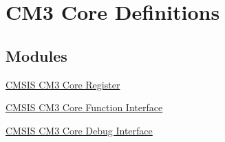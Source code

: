 \hypertarget{group___c_m_s_i_s___c_m3__core__definitions}{\section{C\-M3 Core Definitions}
\label{group___c_m_s_i_s___c_m3__core__definitions}
}
\subsection*{Modules}
\begin{DoxyCompactItemize}
\item 
\hyperlink{group___c_m_s_i_s___c_m3__core__register}{C\-M\-S\-I\-S C\-M3 Core Register}
\item 
\hyperlink{group___c_m_s_i_s___c_m3___core___function_interface}{C\-M\-S\-I\-S C\-M3 Core Function Interface}
\item 
\hyperlink{group___c_m_s_i_s___c_m3___core_debug_interface}{C\-M\-S\-I\-S C\-M3 Core Debug Interface}
\end{DoxyCompactItemize}
